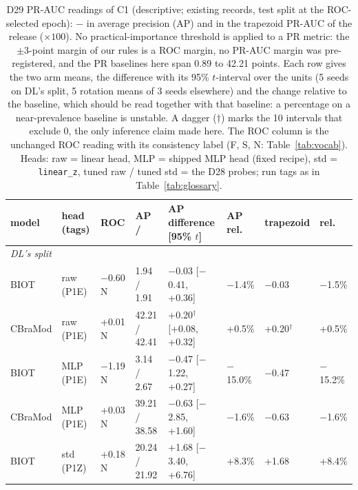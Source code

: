 
\begin{table}[!htbp]
\caption{D29 PR-AUC readings of C1 (descriptive; existing records, test split at the ROC-selected
epoch): \lastarm$-$\lparm{} in average precision (AP) and in the trapezoid PR-AUC of the release
($\times100$). No practical-importance threshold is applied to a PR metric: the $\pm3$-point margin of
our rules is a ROC margin, no PR-AUC margin was pre-registered, and the PR baselines here span
0.89 to 42.21 points. Each row gives the two arm means, the difference with its
95\% $t$-interval over the units (5
seeds on DL's split, 5 rotation means of 3 seeds elsewhere) and the change relative to the \lparm{}
baseline, which should be read together with that baseline: a percentage on a near-prevalence
baseline is
unstable. A dagger ($\dagger$) marks the
10 intervals that exclude 0, the only inference
claim made here. The ROC column is the unchanged ROC reading with its consistency
label (F, S, N: Table~\ref{tab:vocab}). Heads: raw = linear head, MLP = shipped MLP head (fixed
recipe),
std = \texttt{linear\_z}, tuned raw / tuned std = the D28 probes; run tags as in
Table~\ref{tab:glossary}.}
\label{tab:d29pr}
\centering\scriptsize
\setlength{\tabcolsep}{2.5pt}
\begin{tabular}{llllllll}
\toprule
model & head (tags) & ROC & AP \lparm{} / \lastarm{} & AP difference [95\% $t$] & AP rel. & trapezoid & rel.\\
\midrule
\multicolumn{8}{l}{\emph{DL's split}}\\
BIOT & raw (P1E) & $-$0.60 N & 1.94 / 1.91 & $-$0.03 [$-$0.41, +0.36] & $-$1.4\% & $-$0.03 & $-$1.5\%\\
CBraMod & raw (P1E) & +0.01 N & 42.21 / 42.41 & +0.20$^{\dagger}$ [+0.08, +0.32] & +0.5\% & +0.20$^{\dagger}$ & +0.5\%\\
BIOT & MLP (P1E) & $-$1.19 N & 3.14 / 2.67 & $-$0.47 [$-$1.22, +0.27] & $-$15.0\% & $-$0.47 & $-$15.2\%\\
CBraMod & MLP (P1E) & +0.03 N & 39.21 / 38.58 & $-$0.63 [$-$2.85, +1.60] & $-$1.6\% & $-$0.63 & $-$1.6\%\\
BIOT & std (P1Z) & +0.18 N & 20.24 / 21.92 & +1.68 [$-$3.40, +6.76] & +8.3\% & +1.68 & +8.4\%\\

\end{tabular}
\end{table}
